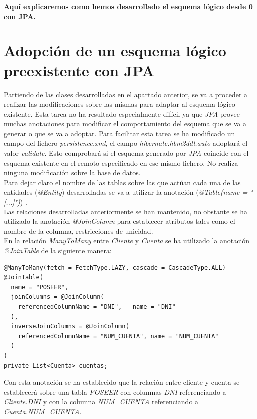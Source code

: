 \documentclass[11pt,a4paper]{article}
\begin{document}
\textbf{Aquí explicaremos como hemos desarrollado el esquema lógico desde 0 con JPA.}

\section{Adopción de un esquema lógico preexistente con JPA}

Partiendo de las clases desarrolladas en el apartado anterior, se va a proceder a realizar las modificaciones sobre las mismas para adaptar al esquema lógico existente. Esta tarea no ha resultado especialmente difícil ya que \emph{JPA} provee muchas anotaciones para modificar el comportamiento del esquema que se va a generar o que se va a adoptar. Para facilitar esta tarea se ha modificado un campo del fichero \emph{persistence.xml}, el campo \emph{hibernate.hbm2ddl.auto} adoptará el valor \emph{validate}. Esto comprobará si el esquema generado por \emph{JPA} coincide con el esquema existente en el remoto especificado en ese mismo fichero. No realiza ninguna modificación sobre la base de datos.\\
Para dejar claro el nombre de las tablas sobre las que actúan cada una de las entidades (\emph{@Entity}) desarrolladas se va a utilizar la anotación (\emph{@Table(name = "[...]")}) .\\
Las relaciones desarrolladas anteriormente se han mantenido, no obstante se ha utilizado la anotación \emph{@JoinColumn} para establecer atributos tales como el nombre de la columna, restricciones de unicidad.\\
En la relación \emph{ManyToMany} entre \emph{Cliente} y \emph{Cuenta} se ha utilizado la anotación \emph{@JoinTable} de la siguiente manera:

\begin{lstlisting}
@ManyToMany(fetch = FetchType.LAZY, cascade = CascadeType.ALL)
@JoinTable(
  name = "POSEER",
  joinColumns = @JoinColumn(
    referencedColumnName = "DNI",	name = "DNI"
  ),
  inverseJoinColumns = @JoinColumn(
    referencedColumnName = "NUM_CUENTA", name = "NUM_CUENTA"
  )
)
private List<Cuenta> cuentas;
\end{lstlisting}

Con esta anotación se ha establecido que la relación entre cliente y cuenta se establecerá sobre una tabla \emph{POSEER} con columnas \emph{DNI} referenciando a \emph{Cliente.DNI} y con la columna \emph{NUM\_{}CUENTA} referenciando a \emph{Cuenta.NUM\_{}CUENTA}.\\
\end{document}
